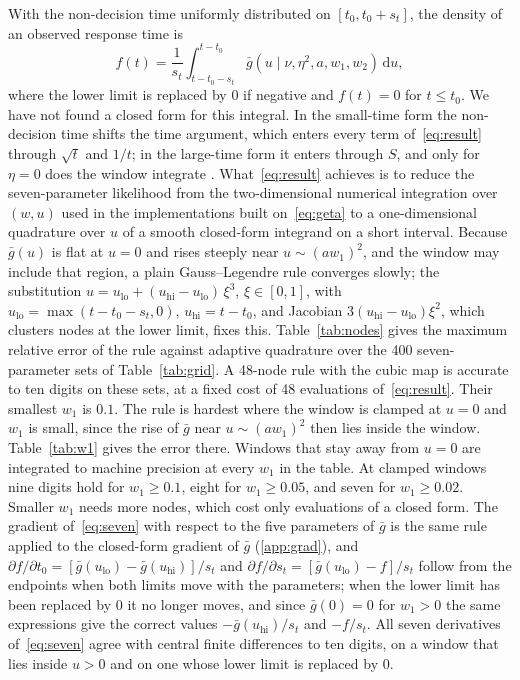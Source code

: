 \documentclass[final,5p,times,twocolumn,authoryear]{elsarticle}
\newcommand{\dd}{\,\mathrm{d}}
\newcommand{\gbar}{\bar{g}}
\begin{document}
With the non-decision time uniformly distributed on $[t_0, t_0 + s_t]$, the density of an observed response time is
\begin{equation}
f(t) = \frac{1}{s_t}\int_{t - t_0 - s_t}^{t - t_0} \gbar\left(u \mid \nu, \eta^2, a, w_1, w_2\right)\dd u ,
\label{eq:seven}
\end{equation}
where the lower limit is replaced by $0$ if negative and $f(t) = 0$ for $t \le t_0$. We have not found a closed form for this integral. In the small-time form the non-decision time shifts the time argument, which enters every term of~\eqref{eq:result} through $\sqrt t$ and $1/t$; in the large-time form it enters through $S$, and only for $\eta = 0$ does the window integrate \citep[Eq.~9]{Tuerlinckx2004}. What~\eqref{eq:result} achieves is to reduce the seven-parameter likelihood from the two-dimensional numerical integration over $(w, u)$ used in the implementations built on~\eqref{eq:geta} to a one-dimensional quadrature over $u$ of a smooth closed-form integrand on a short interval. Because $\gbar(u)$ is flat at $u = 0$ and rises steeply near $u \sim (aw_1)^2$, and the window may include that region, a plain Gauss--Legendre rule converges slowly; the substitution $u = u_{\mathrm{lo}} + (u_{\mathrm{hi}} - u_{\mathrm{lo}})\,\xi^3$, $\xi \in [0, 1]$, with $u_{\mathrm{lo}} = \max(t - t_0 - s_t, 0)$, $u_{\mathrm{hi}} = t - t_0$, and Jacobian $3(u_{\mathrm{hi}} - u_{\mathrm{lo}})\xi^2$, which clusters nodes at the lower limit, fixes this. Table~\ref{tab:nodes} gives the maximum relative error of the rule against adaptive quadrature over the 400 seven-parameter sets of Table~\ref{tab:grid}. A 48-node rule with the cubic map is accurate to ten digits on these sets, at a fixed cost of 48 evaluations of~\eqref{eq:result}. Their smallest $w_1$ is $0.1$. The rule is hardest where the window is clamped at $u = 0$ and $w_1$ is small, since the rise of $\gbar$ near $u \sim (aw_1)^2$ then lies inside the window. Table~\ref{tab:w1} gives the error there. Windows that stay away from $u = 0$ are integrated to machine precision at every $w_1$ in the table. At clamped windows nine digits hold for $w_1 \ge 0.1$, eight for $w_1 \ge 0.05$, and seven for $w_1 \ge 0.02$. Smaller $w_1$ needs more nodes, which cost only evaluations of a closed form. The gradient of~\eqref{eq:seven} with respect to the five parameters of $\gbar$ is the same rule applied to the closed-form gradient of $\gbar$ (\ref{app:grad}), and $\partial f/\partial t_0 = [\gbar(u_{\mathrm{lo}}) - \gbar(u_{\mathrm{hi}})]/s_t$ and $\partial f/\partial s_t = [\gbar(u_{\mathrm{lo}}) - f]/s_t$ follow from the endpoints when both limits move with the parameters; when the lower limit has been replaced by $0$ it no longer moves, and since $\gbar(0) = 0$ for $w_1 > 0$ the same expressions give the correct values $-\gbar(u_{\mathrm{hi}})/s_t$ and $-f/s_t$. All seven derivatives of~\eqref{eq:seven} agree with central finite differences to ten digits, on a window that lies inside $u > 0$ and on one whose lower limit is replaced by $0$.
\end{document}

